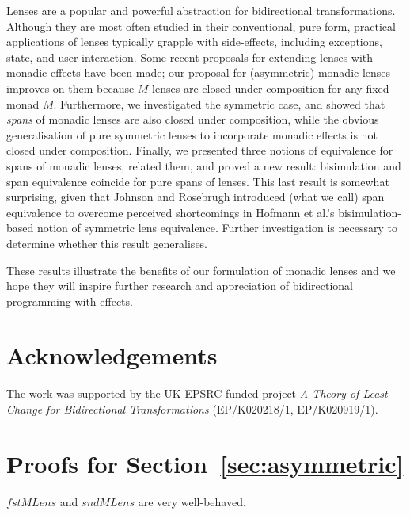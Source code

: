 \documentclass[runningheads]{llncs}
\newcommand{\Conid}[1]{\mathit{#1}}
\newcommand{\Varid}[1]{\mathit{#1}}
\begin{document}
Lenses are a popular and powerful abstraction for bidirectional
transformations.  Although they are most often studied in their
conventional, pure form, practical applications of lenses typically
grapple with side-effects, including exceptions, state, and user
interaction.  Some recent proposals for extending lenses with monadic
effects have been made; our proposal for (asymmetric) monadic lenses
improves on them because \ensuremath{\Conid{M}}-lenses are closed under composition for
any fixed monad
\ensuremath{\Conid{M}}. Furthermore, we investigated the symmetric case, and showed that
\emph{spans} of monadic lenses are also closed under composition, while the
obvious generalisation of pure symmetric lenses to incorporate monadic
effects is not closed under composition.  Finally, we presented three
notions of equivalence for spans of monadic lenses, related them, and
proved a new result: bisimulation and span
equivalence coincide for pure spans of lenses.  This last result is somewhat
surprising, given that Johnson and Rosebrugh introduced (what we call)
span equivalence to overcome perceived shortcomings in Hofmann et al.'s
bisimulation-based notion of symmetric lens equivalence.  Further 
investigation is necessary to determine whether this result
generalises.

These results illustrate the benefits of our formulation of monadic
lenses and we hope they will
inspire further research and
appreciation of bidirectional programming with effects.
\section*{Acknowledgements}
The work was supported by the UK EPSRC-funded project \textit{A
  Theory of Least Change for Bidirectional Transformations}
\citep{tlcbx} (EP/K020218/1, EP/K020919/1). 






\newpage
\appendix
\section{Proofs for Section~\ref{sec:asymmetric}}

\begin{lem:fstM-sndM-vwb}
\ensuremath{\Varid{fstMLens}} and \ensuremath{\Varid{sndMLens}} are very well-behaved. 
\end{lem:fstM-sndM-vwb}
\end{document}

